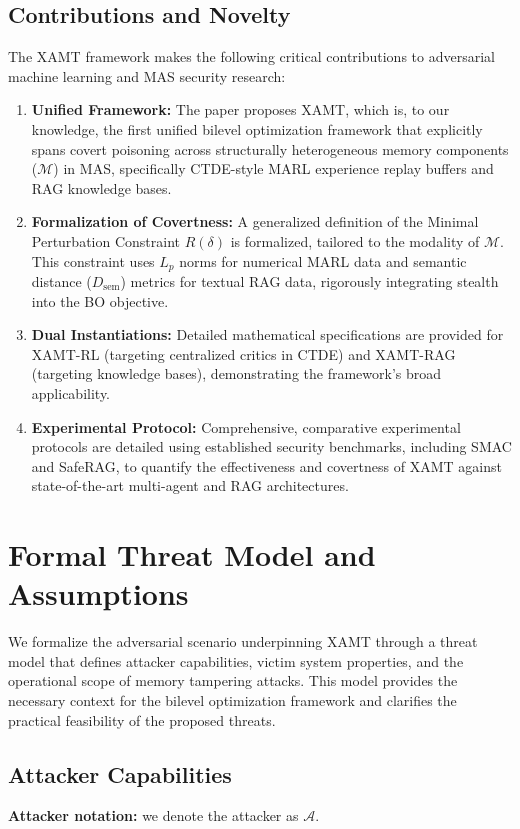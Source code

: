 \documentclass[conference]{IEEEtran}
\begin{document}
\subsection{Contributions and Novelty}
The XAMT framework makes the following critical contributions to adversarial machine learning and MAS security research:

\begin{enumerate}
    \item \textbf{Unified Framework:} The paper proposes XAMT, which is, to our knowledge, the first unified bilevel optimization framework that explicitly spans covert poisoning across structurally heterogeneous memory components ($\mathcal{M}$) in MAS, specifically CTDE-style MARL experience replay buffers and RAG knowledge bases.
    \item \textbf{Formalization of Covertness:} A generalized definition of the Minimal Perturbation Constraint $R(\delta)$ is formalized, tailored to the modality of $\mathcal{M}$. This constraint uses $L_p$ norms for numerical MARL data and semantic distance ($D_{\text{sem}}$) metrics for textual RAG data, rigorously integrating stealth into the BO objective.
    \item \textbf{Dual Instantiations:} Detailed mathematical specifications are provided for XAMT-RL (targeting centralized critics in CTDE) and XAMT-RAG (targeting knowledge bases), demonstrating the framework's broad applicability.
    \item \textbf{Experimental Protocol:} Comprehensive, comparative experimental protocols are detailed using established security benchmarks, including SMAC and SafeRAG, to quantify the effectiveness and covertness of XAMT against state-of-the-art multi-agent and RAG architectures.
\end{enumerate}

\section{Formal Threat Model and Assumptions}
\label{sec:threat_model}

We formalize the adversarial scenario underpinning XAMT through a threat model that defines attacker capabilities, victim system properties, and the operational scope of memory tampering attacks. This model provides the necessary context for the bilevel optimization framework and clarifies the practical feasibility of the proposed threats.

\subsection{Attacker Capabilities}
\textbf{Attacker notation:} we denote the attacker as $\mathcal{A}$.
\end{document}
